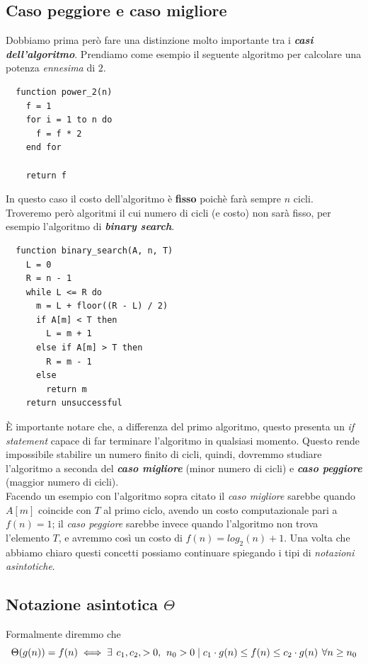 \documentclass[11pt]{article}
\begin{document}
\subsection*{Caso peggiore e caso migliore}
Dobbiamo prima però fare una distinzione molto importante tra i \emph{\textbf{casi dell'algoritmo}}.
Prendiamo come esempio il seguente algoritmo per calcolare una potenza \emph{ennesima} di $2$.

\begin{verbatim}
  function power_2(n)
    f = 1
    for i = 1 to n do
      f = f * 2
    end for

    return f
\end{verbatim}

In questo caso il costo dell'algoritmo è \textbf{fisso} poichè farà sempre
$n$ cicli.\newline
Troveremo però algoritmi il cui numero di cicli (e costo) non sarà fisso, per esempio
l'algoritmo di \emph{\textbf{binary search}}.

\begin{verbatim}
  function binary_search(A, n, T)
    L = 0
    R = n - 1
    while L <= R do
      m = L + floor((R - L) / 2)
      if A[m] < T then
        L = m + 1
      else if A[m] > T then
        R = m - 1
      else
        return m
    return unsuccessful
\end{verbatim}

È importante notare che, a differenza del primo algoritmo, questo 
presenta un \emph{if statement} capace di far terminare l'algoritmo in qualsiasi
momento. Questo rende impossibile stabilire un numero finito di cicli, quindi, dovremmo studiare
l'algoritmo a seconda del \textbf{\emph{caso migliore}} (minor numero di cicli) 
e \textbf{\emph{caso peggiore}} (maggior numero di cicli). \\
Facendo un esempio con l'algoritmo sopra citato il \emph{caso migliore} sarebbe quando
$A[m]$ coincide con $T$ al primo ciclo, avendo un costo computazionale pari a $f(n) = 1$;
il \emph{caso peggiore} sarebbe invece quando l'algoritmo non trova l'elemento $T$, e 
avremmo così un costo di $f(n) = log_2 (n) +1$.
Una volta che abbiamo chiaro questi concetti possiamo continuare spiegando
i tipi di \emph{notazioni asintotiche}.

\subsection*{Notazione asintotica $\Theta$}
Formalmente diremmo che
\[
  \Theta(g(n)) = f(n) \iff
  \exists \hspace{4px} c_1, c_2, > 0,
  \hspace{4px} n_0 > 0 
  \mid 
  c_1 \cdot g(n) \le f(n) \le c_2 \cdot g(n)
  \hspace{4px} \forall n \ge n_0
\]
\end{document}
